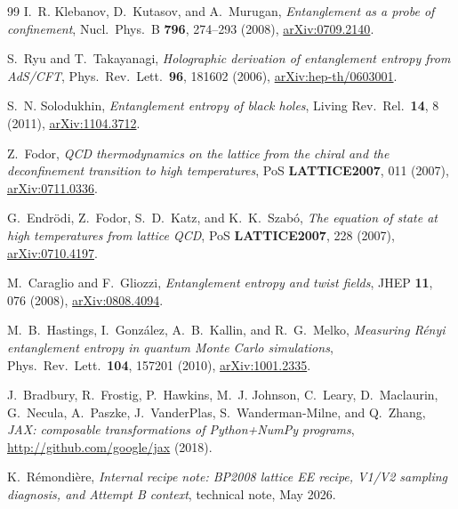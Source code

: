 \documentclass[11pt,a4paper]{article}
\theoremstyle{definition}
\begin{document}
\begin{thebibliography}{99}
I.~R. Klebanov, D.~Kutasov, and A.~Murugan,
\emph{Entanglement as a probe of confinement},
Nucl.\ Phys.\ B \textbf{796}, 274--293 (2008),
\href{https://arxiv.org/abs/0709.2140}{arXiv:0709.2140}.

S.~Ryu and T.~Takayanagi,
\emph{Holographic derivation of entanglement entropy from AdS/CFT},
Phys.\ Rev.\ Lett.\ \textbf{96}, 181602 (2006),
\href{https://arxiv.org/abs/hep-th/0603001}{arXiv:hep-th/0603001}.

S.~N. Solodukhin,
\emph{Entanglement entropy of black holes},
Living Rev.\ Rel.\ \textbf{14}, 8 (2011),
\href{https://arxiv.org/abs/1104.3712}{arXiv:1104.3712}.

Z.~Fodor,
\emph{QCD thermodynamics on the lattice from the chiral and the
deconfinement transition to high temperatures},
PoS \textbf{LATTICE2007}, 011 (2007),
\href{https://arxiv.org/abs/0711.0336}{arXiv:0711.0336}.

G.~Endrödi, Z.~Fodor, S.~D.~Katz, and K.~K.~Szabó,
\emph{The equation of state at high temperatures from lattice QCD},
PoS \textbf{LATTICE2007}, 228 (2007),
\href{https://arxiv.org/abs/0710.4197}{arXiv:0710.4197}.

M.~Caraglio and F.~Gliozzi,
\emph{Entanglement entropy and twist fields},
JHEP \textbf{11}, 076 (2008),
\href{https://arxiv.org/abs/0808.4094}{arXiv:0808.4094}.

M.~B.~Hastings, I.~Gonz\'alez, A.~B.~Kallin, and R.~G.~Melko,
\emph{Measuring Rényi entanglement entropy in quantum Monte Carlo
simulations},
Phys.\ Rev.\ Lett.\ \textbf{104}, 157201 (2010),
\href{https://arxiv.org/abs/1001.2335}{arXiv:1001.2335}.

J.~Bradbury, R.~Frostig, P.~Hawkins, M.~J. Johnson, C.~Leary,
D.~Maclaurin, G.~Necula, A.~Paszke, J.~VanderPlas, S.~Wanderman-Milne,
and Q.~Zhang,
\emph{JAX: composable transformations of Python+NumPy programs},
\url{http://github.com/google/jax} (2018).

K.~Rémondière,
\emph{Internal recipe note: BP2008 lattice EE recipe, V1/V2 sampling
diagnosis, and Attempt B context}, technical note, May 2026.

\end{thebibliography}
\end{document}
